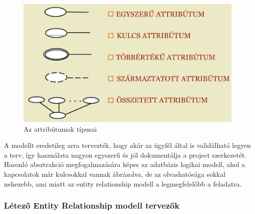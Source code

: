 \documentclass[a4paper,12pt,oneside]{report}
\begin{document}
\begin{justify}
	\begin{figure}[h]
		\includegraphics[width=\textwidth]{contents/images/ermodell_attributes.png}
		\caption{Az attribútumok típusai \cite{book:example_er_attr} }
		\label{fig:ermodell_attributes}
	\end{figure}

	A modellt eredetileg arra tervezték, hogy akár az ügyfél által is validálható legyen a terv, így használata nagyon egyszerű és jól dokumentálja a project szerkezetét. Hasonló absztrakció megfogalmazására képes az adatbázis logikai modell, ahol a kapcsolatok már kulcsokkal vannak ábrázolva, de az olvashatósága sokkal nehezebb, ami miatt az entity relationship modell a legmegfelelőbb a feladatra. 

\end{justify}

\newpage
\subsubsection{Létező Entity Relationship modell tervezők}
\end{document}
